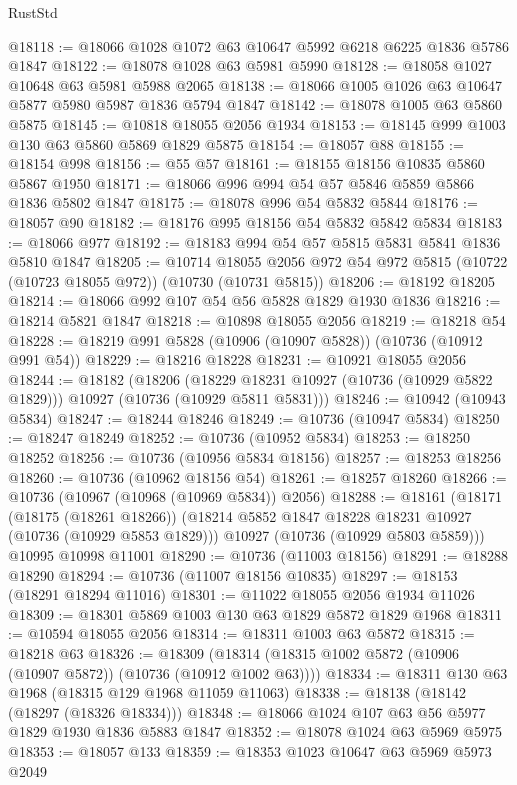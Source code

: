 \begin{lexlean}{RustStd}
\begin{coremodule}
@18118 := @18066 @1028 @1072 @63 @10647 @5992 @6218 @6225 @1836 @5786 @1847
@18122 := @18078 @1028 @63 @5981 @5990
@18128 := @18058 @1027 @10648 @63 @5981 @5988 @2065
@18138 := @18066 @1005 @1026 @63 @10647 @5877 @5980 @5987 @1836 @5794 @1847
@18142 := @18078 @1005 @63 @5860 @5875
@18145 := @10818 @18055 @2056 @1934
@18153 := @18145 @999 @1003 @130 @63 @5860 @5869 @1829 @5875
@18154 := @18057 @88
@18155 := @18154 @998
@18156 := @55 @57
@18161 := @18155 @18156 @10835 @5860 @5867 @1950
@18171 := @18066 @996 @994 @54 @57 @5846 @5859 @5866 @1836 @5802 @1847
@18175 := @18078 @996 @54 @5832 @5844
@18176 := @18057 @90
@18182 := @18176 @995 @18156 @54 @5832 @5842 @5834
@18183 := @18066 @977
@18192 := @18183 @994 @54 @57 @5815 @5831 @5841 @1836 @5810 @1847
@18205 := @10714
    @18055
    @2056
    @972
    @54
    @972
    @5815
    (@10722 (@10723 @18055 @972))
    (@10730 (@10731 @5815))
@18206 := @18192 @18205
@18214 := @18066 @992 @107 @54 @56 @5828 @1829 @1930 @1836
@18216 := @18214 @5821 @1847
@18218 := @10898 @18055 @2056
@18219 := @18218 @54
@18228 := @18219 @991 @5828 (@10906 (@10907 @5828)) (@10736 (@10912 @991 @54))
@18229 := @18216 @18228
@18231 := @10921 @18055 @2056
@18244 := @18182
    (@18206
      (@18229 @18231 @10927 (@10736 (@10929 @5822 @1829)))
      @10927
      (@10736 (@10929 @5811 @5831)))
@18246 := @10942 (@10943 @5834)
@18247 := @18244 @18246
@18249 := @10736 (@10947 @5834)
@18250 := @18247 @18249
@18252 := @10736 (@10952 @5834)
@18253 := @18250 @18252
@18256 := @10736 (@10956 @5834 @18156)
@18257 := @18253 @18256
@18260 := @10736 (@10962 @18156 @54)
@18261 := @18257 @18260
@18266 := @10736 (@10967 (@10968 (@10969 @5834)) @2056)
@18288 := @18161
    (@18171
      (@18175 (@18261 @18266))
      (@18214 @5852 @1847 @18228 @18231 @10927 (@10736 (@10929 @5853 @1829)))
      @10927
      (@10736 (@10929 @5803 @5859)))
    @10995
    @10998
    @11001
@18290 := @10736 (@11003 @18156)
@18291 := @18288 @18290
@18294 := @10736 (@11007 @18156 @10835)
@18297 := @18153 (@18291 @18294 @11016)
@18301 := @11022 @18055 @2056 @1934 @11026
@18309 := @18301 @5869 @1003 @130 @63 @1829 @5872 @1829 @1968
@18311 := @10594 @18055 @2056
@18314 := @18311 @1003 @63 @5872
@18315 := @18218 @63
@18326 := @18309 (@18314 (@18315 @1002 @5872 (@10906 (@10907 @5872)) (@10736 (@10912 @1002 @63))))
@18334 := @18311 @130 @63 @1968 (@18315 @129 @1968 @11059 @11063)
@18338 := @18138 (@18142 (@18297 (@18326 @18334)))
@18348 := @18066 @1024 @107 @63 @56 @5977 @1829 @1930 @1836 @5883 @1847
@18352 := @18078 @1024 @63 @5969 @5975
@18353 := @18057 @133
@18359 := @18353 @1023 @10647 @63 @5969 @5973 @2049

\end{coremodule}
\end{lexlean}
